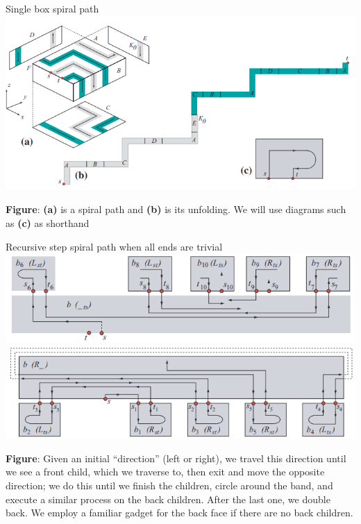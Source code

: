 \documentclass{beamer}
\theoremstyle{plain}
\begin{document}
  \begin{frame}{Single box spiral path}
    \includegraphics[width=\textwidth]{./figs/New_diagram_who_dis.png}
    \begin{center}
      \footnotesize \textbf{Figure}: \textbf{(a)} is a spiral path and \textbf{(b)} is its unfolding.
    We will use diagrams such as \textbf{(c)} as shorthand 
    \end{center}
  \end{frame}

  \begin{frame}{Recursive step spiral path when all ends are trivial}
    \includegraphics[width=\textwidth]{./figs/Recursive_step_example_front.png}
    \includegraphics[width=\textwidth]{./figs/Recursive_step_example_back.png}
   
    \begin{center}
      \tiny
      \textbf{Figure}:
      Given an initial ``direction'' (left or right), we travel this direction until we see a front child, which we traverse to, then exit and move the opposite direction;
      we do this until we finish the children, circle around the band, and execute a similar process on the back children.
      After the last one, we double back.
      We employ a familiar gadget for the back face if there are no back children.
    \end{center}
  \end{frame}
\end{document}
